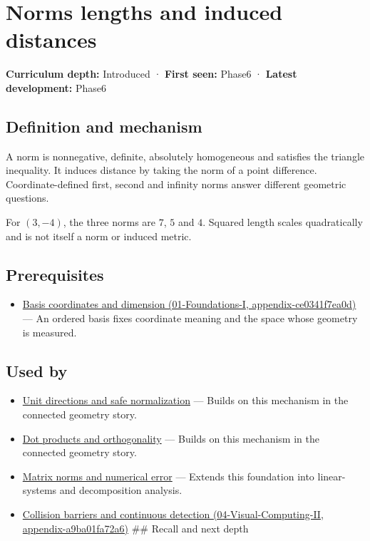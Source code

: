 \hypertarget{appendix-49933872bb51}{}
\section{Norms lengths and induced distances}\label{appendix-49933872bb51-norms-lengths-and-induced-distances}

\textbf{Curriculum depth:} Introduced · \textbf{First seen:} Phase6 · \textbf{Latest development:} Phase6

\subsection{Definition and mechanism}\label{appendix-49933872bb51-definition-and-mechanism}

A norm is nonnegative, definite, absolutely homogeneous and satisfies the triangle inequality. It induces distance by taking the norm of a point difference. Coordinate-defined first, second and infinity norms answer different geometric questions.

For \((3,-4)\), the three norms are \(7\), \(5\) and \(4\). Squared length scales quadratically and is not itself a norm or induced metric.

\subsection{Prerequisites}\label{appendix-49933872bb51-prerequisites}

\begin{itemize}
\tightlist
\item
  \href{../01-Foundations-I/main.pdf\#nameddest=appendix-ce0341f7ea0d}{Basis coordinates and dimension (01-Foundations-I, appendix-ce0341f7ea0d)} --- An ordered basis fixes coordinate meaning and the space whose geometry is measured.
\end{itemize}

\subsection{Used by}\label{appendix-49933872bb51-used-by}

\begin{itemize}
\item
  \hyperref[appendix-f744e41b95b4]{Unit directions and safe normalization} --- Builds on this mechanism in the connected geometry story.
\item
  \hyperref[appendix-8bc4e8fc547c]{Dot products and orthogonality} --- Builds on this mechanism in the connected geometry story.
\item
  \hyperref[appendix-f8657bac66e5]{Matrix norms and numerical error} --- Extends this foundation into linear-systems and decomposition analysis.
\item
  \href{../04-Visual-Computing-II/main.pdf\#nameddest=appendix-a9ba01fa72a6}{Collision barriers and continuous detection (04-Visual-Computing-II, appendix-a9ba01fa72a6)} \#\# Recall and next depth
\end{itemize}

